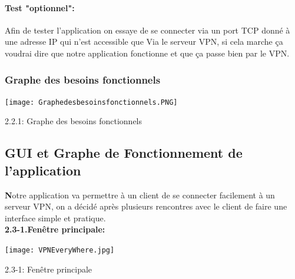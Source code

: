 \documentclass[12pt,a4paper]{article}
\begin{document}
\paragraph{ Test "optionnel": } 
Afin de tester  l’application on essaye de se connecter via un port TCP donné à  une adresse IP qui n'est accessible que Via le serveur VPN, si cela marche ça voudrai dire que notre application fonctionne et que ça passe bien par le VPN.

\subsubsection{Graphe des besoins fonctionnels}
\begin{center}
\texttt{[image: Graphedesbesoinsfonctionnels.PNG]}
\end{center}
\begin{center}
{2.2.1: Graphe des besoins fonctionnels }
\end{center}
\subsection{GUI et Graphe de Fonctionnement de l'application}
\textbf
Notre application va permettre à un client de se connecter facilement à un serveur VPN, on a décidé après plusieurs rencontres avec le client de faire une interface simple et pratique. \\
\newpage
\textbf{2.3-1.Fenêtre principale: }\\
\begin{center}
\texttt{[image: VPNEveryWhere.jpg]}
\end{center}
\begin{center}

{2.3-1: Fenêtre principale }
\end{center}
\end{document}
